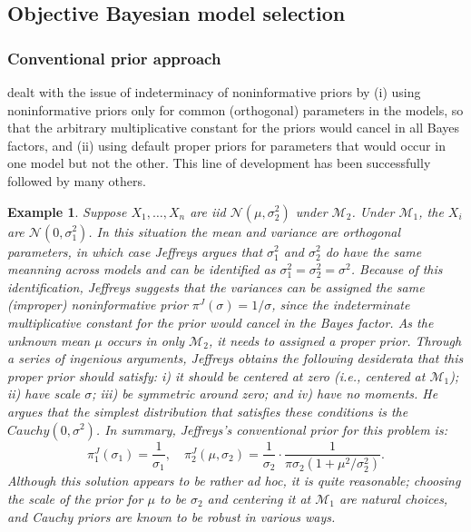 \documentclass[11pt]{article}
\theoremstyle{plain}
\newtheorem{example}{Example}
\theoremstyle{definition}
\theoremstyle{remark}
\begin{document}
\subsection{Objective Bayesian model selection}

\subsubsection{Conventional prior approach}
\cite[Chapter 5]{book:821070} dealt with the issue of indeterminacy of noninformative priors by (i) using noninformative priors only for common (orthogonal) parameters in the models, so that the arbitrary multiplicative constant for the priors would cancel in all Bayes factors, and (ii) using default proper priors for  parameters that would occur in one model but not the other.
This line of development has been successfully followed by many others.

\begin{example}
    Suppose $X_1,\ldots, X_n$ are iid $\mathcal N(\mu,\sigma_2^2)$ under $\mathcal M_2$.
    Under $\mathcal M_1$, the $X_i$ are $\mathcal N (0, \sigma_1^2)$.
    In this situation the mean and variance are orthogonal parameters, in which case Jeffreys argues that $\sigma^2_1$ and $\sigma^2_2$ do have the same meanning across models and can be identified as $\sigma_1^2 = \sigma_2^2 =\sigma^2$.
    Because of this identification, Jeffreys suggests that the variances can be assigned the same (improper) noninformative prior $\pi^J (\sigma) = 1/\sigma$, since the indeterminate multiplicative constant for the prior would cancel in the Bayes factor.
    As the unknown mean $\mu$ occurs in only $\mathcal M_2$, it needs to assigned a proper prior.
Through a series of ingenious arguments, Jeffreys obtains the following desiderata that this proper prior should satisfy: i) it should be centered at zero (i.e., centered at $\mathcal M_1$); ii) have scale $\sigma$; iii) be symmetric around zero; and iv) have no moments.
He argues that the simplest distribution that satisfies these conditions is the $Cauchy(0,\sigma^2)$.
In summary, Jeffreys's conventional prior for this problem is:
\begin{equation*}
    \pi_1^{J} (\sigma_1) = \frac{1}{\sigma_1}, \quad \pi_2^J (\mu,\sigma_2) = \frac{1}{\sigma_2} \cdot \frac{1}{\pi \sigma_2 (1+\mu^2/\sigma_2^2)} .
\end{equation*}
Although this solution appears to be rather ad hoc, it is quite reasonable; choosing the scale of the prior for $\mu$ to be $\sigma_2$ and centering it at $\mathcal M_1$ are natural choices, and Cauchy priors are known to be robust in various ways.
\end{example}
\end{document}
